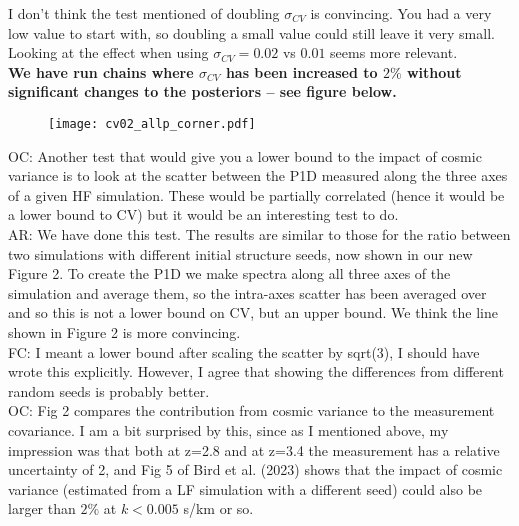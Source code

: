 \documentclass[12pt]{article}
\begin{document}
I don’t think the test mentioned of doubling $\sigma_{CV}$ is convincing. You had a very low value to start with, so doubling a small value could still leave it very small. Looking at the effect when using $\sigma_{CV} = 0.02$ vs $0.01$ seems more relevant.\\

\textbf{We have run chains where $\sigma_{CV}$ has been increased to $2\%$ without significant changes to the posteriors -- see figure below.}

\begin{figure}[h!]
    \centering
    \texttt{[image: cv02\_allp\_corner.pdf]}
\end{figure}

\hrulefill \newline

OC: Another test that would give you a lower bound to the impact of cosmic variance is to look at the scatter between the P1D measured along the three axes of a given HF simulation. These would be partially correlated (hence it would be a lower bound to CV) but it would be an interesting test to do.\\

AR: We have done this test. The results are similar to those for the ratio between two simulations with different initial structure seeds, now shown in our new Figure 2. To create the P1D we make spectra along all three axes of the simulation and average them, so the intra-axes scatter has been averaged over and so this is not a lower bound on CV, but an upper bound. We think the line shown in Figure 2 is more convincing.\\

FC: I meant a lower bound after scaling the scatter by sqrt(3), I should have wrote this explicitly. However, I agree that showing the differences from different random seeds is probably better.\\

OC: Fig 2 compares the contribution from cosmic variance to the measurement covariance. I am a bit surprised by this, since as I mentioned above, my impression was that both at z=2.8 and at z=3.4 the measurement has a relative uncertainty of 2, and Fig 5 of Bird et al. (2023) shows that the impact of cosmic variance (estimated from a LF simulation with a different seed) could also be larger than $2\%$ at $k < 0.005$ s/km or so.\\
\end{document}
